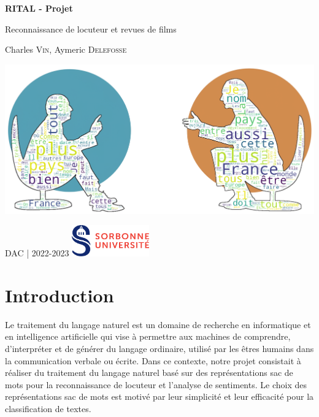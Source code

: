 \documentclass{article}
\begin{document}
\begin{titlepage}
    \begin{center}
        \vspace*{1cm}

        \Huge
        \textbf{RITAL - Projet}

        \LARGE
        Reconnaissance de locuteur et revues de films

        \Large
        Charles \textsc{Vin}, Aymeric \textsc{Delefosse}

        \vfill
        \includegraphics[width=\textwidth]{./src/locuteur/NLP.png}    
        \vfill

        \large
        DAC | 2022-2023 \hfill 
        \includegraphics[width=0.25\textwidth]{./src/logo.png}
        \hfill
        
        
    \end{center}
\end{titlepage}

\tableofcontents
\newpage

\section{Introduction}

Le traitement du langage naturel est un domaine de recherche en informatique et en intelligence artificielle qui vise à permettre aux machines de comprendre, d'interpréter et de générer du langage ordinaire, utilisé par les êtres humains dans la communication verbale ou écrite. Dans ce contexte, notre projet consistait à réaliser du traitement du langage naturel basé sur des représentations sac de mots pour la reconnaissance de locuteur et l'analyse de sentiments. Le choix des représentations sac de mots est motivé par leur simplicité et leur efficacité pour la classification de textes.
\end{document}
